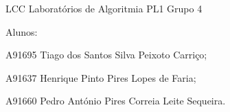 L\+CC Laboratórios de Algoritmia P\+L1 Grupo 4

Alunos\+:
\begin{DoxyItemize}
\item A91695 Tiago dos Santos Silva Peixoto Carriço;
\item A91637 Henrique Pinto Pires Lopes de Faria;
\item A91660 Pedro António Pires Correia Leite Sequeira. 
\end{DoxyItemize}